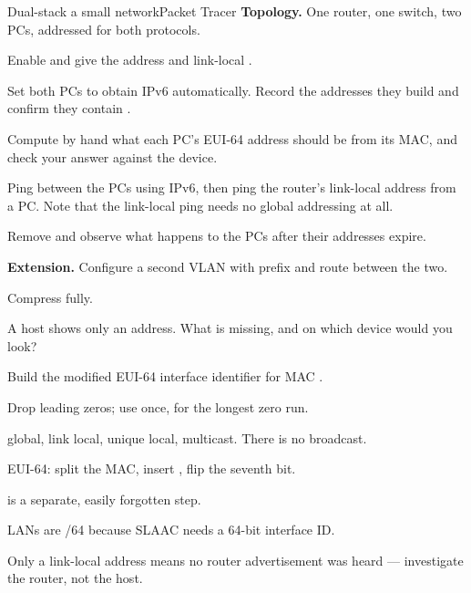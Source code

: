 \begin{lab}{Dual-stack a small network}{Packet Tracer}
\textbf{Topology.} One router, one switch, two PCs, addressed for both protocols.

\begin{tasks}
  \item Enable  and give  the address
         and link-local .
  \item Set both PCs to obtain IPv6 automatically. Record the addresses they
        build and confirm they contain .
  \item Compute by hand what each PC's EUI-64 address should be from its MAC,
        and check your answer against the device.
  \item Ping between the PCs using IPv6, then ping the router's link-local
        address from a PC. Note that the link-local ping needs no global
        addressing at all.
  \item Remove  and observe what happens to the PCs
        after their addresses expire.
  \item \textbf{Extension.} Configure a second VLAN with prefix
         and route between the two.
\end{tasks}
\end{lab}

\begin{checkpoint}
\begin{tightnum}
  \item Compress  fully.
  \item A host shows only an  address. What is missing, and on which
        device would you look?
  \item Build the modified EUI-64 interface identifier for MAC
        .
\end{tightnum}
\end{checkpoint}

\begin{chaptersummary}
\begin{tight}
  \item Drop leading zeros; use \cmd{::} once, for the longest zero run.
  \item {} global,  link local,  unique
        local,  multicast. There is no broadcast.
  \item EUI-64: split the MAC, insert , flip the seventh bit.
  \item {} is a separate, easily forgotten step.
  \item LANs are /64 because SLAAC needs a 64-bit interface ID.
  \item Only a link-local address means no router advertisement was heard ---
        investigate the router, not the host.
\end{tight}
\end{chaptersummary}

